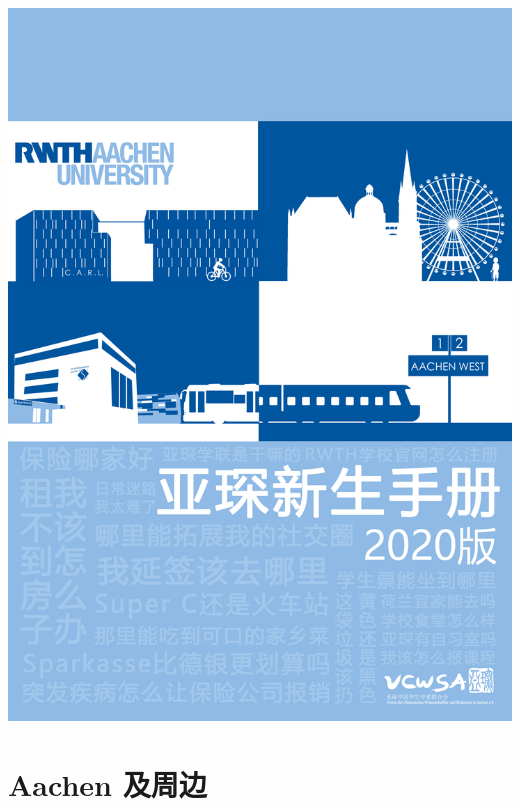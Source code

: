 \documentclass[a4paper,lang=cn,10pt,newtx,scheme=chinese]{elegantbook}
\begin{document}
\begin{titlepage}
\parindent=0pt
\includegraphics[width=\linewidth]{Bilder/Front_Cover_.png}
\end{titlepage}

\maketitle
\frontmatter

\tableofcontents

\mainmatter

\part{Aachen 及周边}



\end{document}
